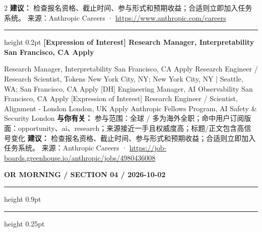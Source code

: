 \documentclass[10.5pt]{ctexart}
\begin{document}
\begin{multicols}{2}
\textbf{建议：} 检查报名资格、截止时间、参与形式和预期收益；合适则立即加入任务系统。
{\footnotesize\color{ormuted} 来源：Anthropic Careers · \url{https://www.anthropic.com/careers}}
\vspace{2mm}
\hrule height 0.2pt
\vspace{2mm}
{\large\bfseries [Expression of Interest] Research Manager, Interpretability San Francisco, CA Apply}\par
[Expression of Interest] Research Manager, Interpretability San Francisco, CA Apply Research Engineer / Research Scientist, Tokens New York City, NY; New York City, NY | Seattle, WA; San Francisco, CA Apply [DH] Engineering Manager, AI Observability San Francisco, CA Apply [Expression of Interest] Research Engineer / Scientist, Alignment - London London, UK Apply Anthropic Fellows Program, AI Safety \& Security London
\textbf{与你有关：} 参与范围：全球 / 多为海外全职；命中用户订阅版面：opportunity、ai、research；来源接近一手且权威度高；标题/正文包含高信号变化
\textbf{建议：} 检查报名资格、截止时间、参与形式和预期收益；合适则立即加入任务系统。
{\footnotesize\color{ormuted} 来源：Anthropic Careers · \url{https://job-boards.greenhouse.io/anthropic/jobs/4980436008}}
\end{multicols}
\newpage
{\small\bfseries OR MORNING / SECTION 04 / 2026-10-02}
\vspace{2mm}
\hrule height 0.9pt
\vspace{1.5mm}
\hrule height 0.25pt
\vspace{4mm}
\end{document}

